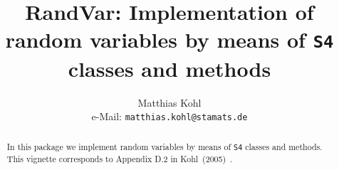 \documentclass[11pt]{article}
\begin{document}
\title{RandVar: Implementation of random variables by means
    of {\tt S4} classes and methods}
\author{Matthias Kohl\\
e-Mail: {\tt matthias.kohl@stamats.de}\\
}
\maketitle
\begin{abstract}
In this package we implement random variables by means of {\tt S4} classes
and methods. This vignette corresponds to Appendix D.2 in Kohl~(2005)~\cite{MK:05}.
\end{abstract}
\tableofcontents
\clearpage
\end{document}
